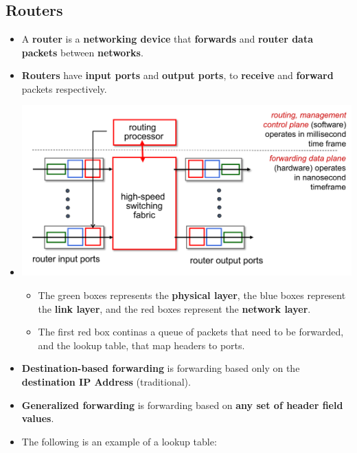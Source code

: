 \documentclass{article}
\begin{document}
\section*{}

    \subsection*{Routers}
    \begin{itemize}
        \item A \textbf{router} is a \textbf{networking device} that \textbf{forwards} and \textbf{router data packets} between \textbf{networks}.
        \item \textbf{Routers} have \textbf{input ports} and \textbf{output ports}, to \textbf{receive} and \textbf{forward} packets respectively.
        \item[] \includegraphics[width=\textwidth - 25pt]{images/Router-Overview.png}
        \begin{itemize}
            \item The green boxes represents the \textbf{physical layer}, the blue boxes represent the \textbf{link layer}, and the red boxes represent the \textbf{network layer}.
            \item The first red box continas a queue of packets that need to be forwarded, and the lookup table, that map headers to ports.
        \end{itemize}
        \item \textbf{Destination-based forwarding} is forwarding based only on the \textbf{destination IP Address} (traditional).
        \item \textbf{Generalized forwarding} is forwarding based on \textbf{any set of header field values}.
        \item The following is an example of a lookup table:

\end{itemize}
\end{document}
